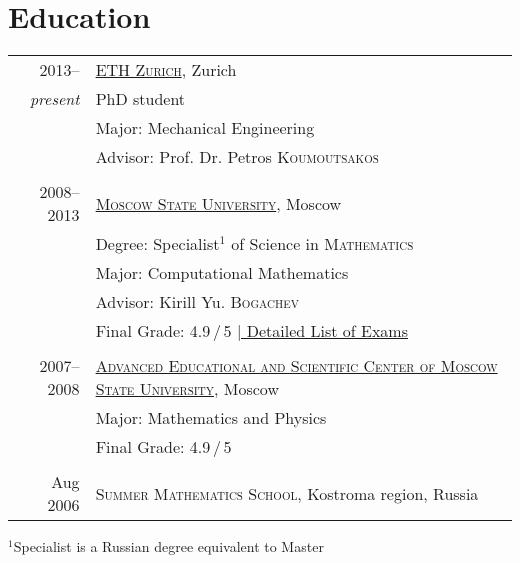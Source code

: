 \documentclass[a4paper,10pt]{article}
\begin{document}
\section{Education}
\begin{tabular}{r|p{13cm}}
 2013-- & \href{http://www.ethz.ch}{\textsc{ETH Zurich}}, Zurich\\
  \emph{present} & PhD student \\
                 & Major: Mechanical Engineering \\
                 & Advisor: Prof. Dr. Petros \textsc{Koumoutsakos} \\

\multicolumn{2}{c}{} \\

 2008--2013 & \href{http://www.msu.ru/en/}{\textsc{Moscow State University}}, Moscow\\
 & Degree: Specialist$^1\!\!$ of Science in \textsc{Mathematics}\\
 & Major: Computational Mathematics\\
 & Advisor: Kirill Yu. \textsc{Bogachev}\\
 &\normalsize Final Grade: 4.9\,/\,5 \hyperlink{grds}{\hfill | \footnotesize Detailed List of Exams}\\

\multicolumn{2}{c}{} \\

 2007--2008& \href{http://www.aesc.msu.ru/}{\textsc{Advanced Educational and Scientific Center of Moscow State University}}, Moscow \\
 & Major: Mathematics and Physics \\
 &Final Grade: 4.9\,/\,5\\



\multicolumn{2}{c}{} \\

 Aug 2006 & \textsc{Summer Mathematics School}, Kostroma region, Russia
\end{tabular}
\linebreak

\footnotesize{$^1$Specialist is a Russian degree equivalent to Master} \normalsize

\end{document}
